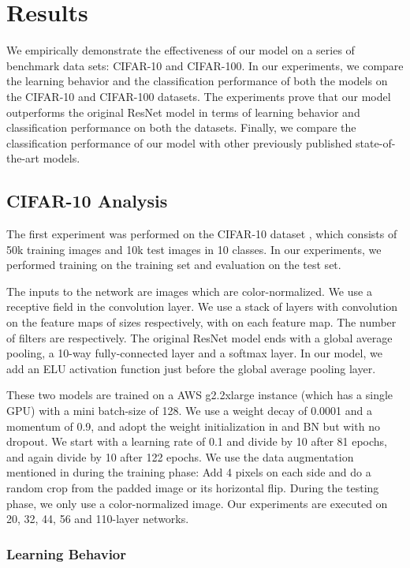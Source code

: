 \documentclass[10pt,twocolumn,letterpaper]{article}
\begin{document}
\section{Results}

We empirically demonstrate the effectiveness of our model on a series of benchmark data sets: CIFAR-10 and CIFAR-100. In our experiments, we compare the learning behavior and the classification performance of both the models on the CIFAR-10 and CIFAR-100 datasets. The experiments prove that our model outperforms the original ResNet model in terms of learning behavior and classification performance on both the datasets. Finally, we compare the classification performance of our model with other previously published state-of-the-art models.  

\subsection{CIFAR-10 Analysis}
\label{cifar10analysis}

The first experiment was performed on the CIFAR-10 dataset \cite{[10]}, which consists of 50k training images and 10k test images in 10 classes. In our experiments, we performed training on the training set and evaluation on the test set.

The inputs to the network are  images which are color-normalized. We use a  receptive field in the convolution layer. We use a stack of  layers with  convolution on the feature maps of sizes  respectively, with  on each feature map. The number of filters are  respectively. The original ResNet model ends with a global average pooling, a 10-way fully-connected layer and a softmax layer. In our model, we add an ELU activation function just before the global average pooling layer.

These two models are trained on a AWS g2.2xlarge instance (which has a single GPU) with a mini batch-size of 128. We use a weight decay of 0.0001 and a momentum of 0.9, and adopt the weight initialization in \cite{[5]} and BN \cite{[4]} but with no dropout. We start with a learning rate of 0.1 and divide by 10 after 81 epochs, and again divide by 10 after 122 epochs. We use the data augmentation mentioned in \cite{[18]} during the training phase: Add 4 pixels on each side and do a random  crop from the padded image or its horizontal flip. During the testing phase, we only use a color-normalized  image. Our experiments are executed on 20, 32, 44, 56 and 110-layer networks.

\subsubsection{Learning Behavior}
\end{document}
